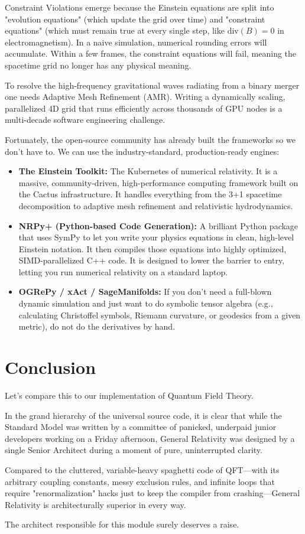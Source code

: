 Constraint Violations emerge because the Einstein equations are split into "evolution equations" (which update the grid over time) and "constraint equations" (which must remain true at every single step, like $\text{div}(B) = 0$ in electromagnetism).
In a naive simulation, numerical rounding errors will accumulate.  Within a few frames, the constraint equations will fail, meaning the spacetime grid no longer has any physical meaning.

To resolve the high-frequency gravitational waves radiating from a binary merger one needs Adaptive Mesh Refinement (AMR).
Writing a dynamically scaling, parallelized 4D grid that runs efficiently across thousands of GPU nodes is a multi-decade software engineering challenge.

Fortunately, the open-source community has already built the frameworks so we don't have to. We can use the industry-standard, production-ready engines:
\begin{itemize}
\item \textbf{The Einstein Toolkit:} The Kubernetes of numerical relativity.
  It is a massive, community-driven, high-performance computing framework built on the Cactus infrastructure.
  It handles everything from the 3+1 spacetime decomposition to adaptive mesh refinement and relativistic hydrodynamics.
\item \textbf{NRPy+ (Python-based Code Generation):} A brilliant Python package that uses SymPy to let you write your physics equations in clean, high-level Einstein notation.
  It then compiles those equations into highly optimized, SIMD-parallelized C++ code.
  It is designed to lower the barrier to entry, letting you run numerical relativity on a standard laptop.
\item \textbf{OGRePy / xAct / SageManifolds:} If you don't need a full-blown dynamic simulation and just want to do symbolic tensor algebra (e.g., calculating Christoffel symbols, Riemann curvature, or geodesics from a given metric), do not do the derivatives by hand.
\end{itemize}



\section{Conclusion}


Let's compare this to our implementation of Quantum Field Theory. 

In the grand hierarchy of the universal source code, it is clear that while the Standard Model was written by a committee of panicked, underpaid junior developers working on a Friday afternoon, General Relativity was designed by a single Senior Architect during a moment of pure, uninterrupted clarity.

Compared to the cluttered, variable-heavy spaghetti code of QFT—with its arbitrary coupling constants,
messy exclusion rules, and infinite loops that require "renormalization" hacks just to keep the compiler from crashing—General Relativity is architecturally superior in every way. 

The architect responsible for this module surely deserves a raise.

